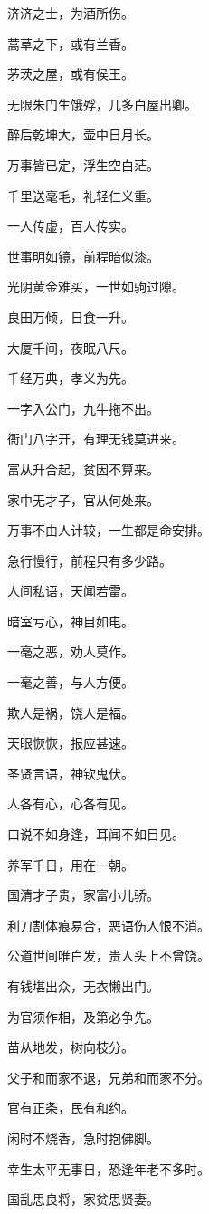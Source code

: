 \documentclass[12pt,oneside]{book}
\begin{document}
济济之士，为酒所伤。

蒿草之下，或有兰香。

茅茨之屋，或有侯王。

无限朱门生饿殍，几多白屋出卿。

醉后乾坤大，壶中日月长。

万事皆已定，浮生空白茫。

千里送毫毛，礼轻仁义重。

一人传虚，百人传实。

世事明如镜，前程暗似漆。

光阴黄金难买，一世如驹过隙。

良田万倾，日食一升。

大厦千间，夜眠八尺。

千经万典，孝义为先。

一字入公门，九牛拖不出。

衙门八字开，有理无钱莫进来。

富从升合起，贫因不算来。

家中无才子，官从何处来。

万事不由人计较，一生都是命安排。

急行慢行，前程只有多少路。

人间私语，天闻若雷。

暗室亏心，神目如电。

一毫之恶，劝人莫作。

一毫之善，与人方便。

欺人是祸，饶人是福。

天眼恢恢，报应甚速。

圣贤言语，神钦鬼伏。

人各有心，心各有见。

口说不如身逢，耳闻不如目见。

养军千日，用在一朝。

国清才子贵，家富小儿骄。

利刀割体痕易合，恶语伤人恨不消。

公道世间唯白发，贵人头上不曾饶。

有钱堪出众，无衣懒出门。

为官须作相，及第必争先。

苗从地发，树向枝分。

父子和而家不退，兄弟和而家不分。

官有正条，民有和约。

闲时不烧香，急时抱佛脚。

幸生太平无事日，恐逢年老不多时。

国乱思良将，家贫思贤妻。
\end{document}
